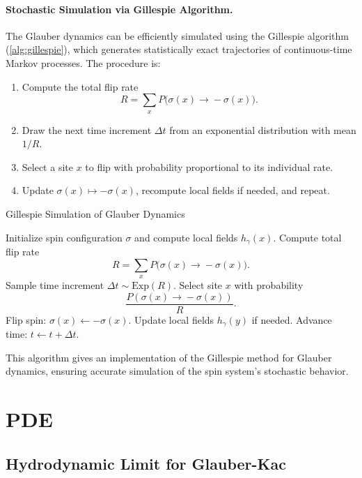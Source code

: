 \documentclass[11pt,a4paper]{article}
\begin{document}
\paragraph{Stochastic Simulation via Gillespie Algorithm.}  
The Glauber dynamics can be efficiently simulated using the Gillespie algorithm (\cref{alg:gillespie}), 
which generates statistically exact trajectories of continuous-time Markov processes. 
The procedure is:

\begin{enumerate}
    \item Compute the total flip rate 
    \[
        R = \sum_{x} P\big(\sigma(x)\!\to\!-\sigma(x)\big).
    \]
    \item Draw the next time increment $\Delta t$ from an exponential distribution with mean $1/R$.
    \item Select a site $x$ to flip with probability proportional to its individual rate.
    \item Update $\sigma(x)\mapsto -\sigma(x)$, recompute local fields if needed, and repeat.
\end{enumerate}

\begin{algorithm}[h!]
\caption{Gillespie Simulation of Glauber Dynamics}
\label{alg:gillespie}
\begin{algorithmic}[1]
\State Initialize spin configuration $\sigma$ and compute local fields $h_\gamma(x)$.
    \State Compute total flip rate 
    \[
        R = \sum_{x} P\big(\sigma(x)\!\to\!-\sigma(x)\big).
    \]
    \State Sample time increment $\Delta t \sim \mathrm{Exp}(R)$.
    \State Select site $x$ with probability 
    \[
        \frac{P(\sigma(x)\!\to\!-\sigma(x))}{R}.
    \]
    \State Flip spin: $\sigma(x) \gets -\sigma(x)$.
    \State Update local fields $h_\gamma(y)$ if needed.
    \State Advance time: $t \gets t + \Delta t$.
\EndWhile
\end{algorithmic}
\end{algorithm}
This algorithm gives an implementation of the Gillespie method for Glauber dynamics, ensuring accurate simulation of the spin system's stochastic behavior.

\section{PDE}

\subsection{Hydrodynamic Limit for Glauber-Kac}
\end{document}
